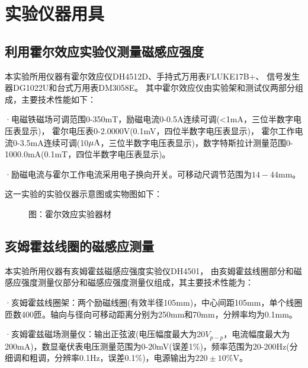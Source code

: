 \documentclass[11pt]{article}
\renewcommand{\emph}[1]{\begin{kaishu}#1\end{kaishu}}
\begin{document}
\section{实验仪器用具}

\subsection{利用霍尔效应实验仪测量磁感应强度}

	本实验所用仪器有霍尔效应仪DH4512D、手持式万用表FLUKE17B+、
	信号发生器DG1022U和台式万用表DM3058E。
	其中霍尔效应仪由实验架和测试仪两部分组成，主要技术性能如下：

	·电磁铁磁场可调范围0-350mT，励磁电流0-0.5A连续可调(<1mA，三位半数字电压表显示)，
	霍尔电压表0-2.0000V(0.1mV，四位半数字电压表显示)，
	霍尔工作电流0-3.5mA连续可调(10$\rm \mu A$，三位半数字电压表显示)，数字特斯拉计测量范围0-1000.0mA(0.1mT，四位半数字电压表显示)。

	·励磁电流与霍尔工作电流采用电子换向开关。可移动尺调节范围为$14-44$mm。

这一实验的实验仪器示意图或实物图如下：
	\begin{figure}[H]
		\centering
		\emph{}
		\hspace{0.5in}
		\emph{}
		\hspace{0.5in}
		\bf\emph{\caption*{图：霍尔效应实验器材}}
	\end{figure}

\subsection{亥姆霍兹线圈的磁感应测量}
	本实验所用仪器有亥姆霍兹磁感应强度实验仪DH4501，
	由亥姆霍兹线圈部分和磁感应强度测量仪部分和磁感应强度测量仪组成，其主要技术性能为：
	
	·亥姆霍兹线圈架：两个励磁线圈(有效半径105mm)，中心间距105mm，单个线圈匝数400匝。轴向与径向可移动距离分别为250mm和70mm，分辨率均为0.1mm。

	·亥姆霍兹磁场测量仪：输出正弦波(电压幅度最大为20$V_{p-p}$，电流幅度最大为200mA)，数显毫伏表电压测量范围为0-20mV(误差1\%)，频率范围为20-200Hz(分细调和粗调，分辨率0.1Hz，误差0.1\%)，电源输出为$220\pm 10\%$V。
\end{document}

